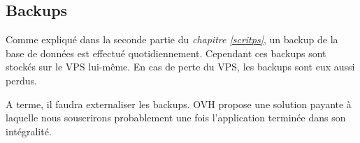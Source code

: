 \newpage

\subsection{Backups}

Comme expliqué dans la seconde partie du \textit{chapitre \ref{scritps}}, un backup de la base de données est effectué quotidiennement. Cependant ces backups sont stockés sur le VPS lui-même. En cas de perte du VPS, les backups sont eux aussi perdus.

\newpara

A terme, il faudra externaliser les backups. OVH propose une solution payante à laquelle nous souscrirons probablement une fois l'application terminée dans son intégralité.